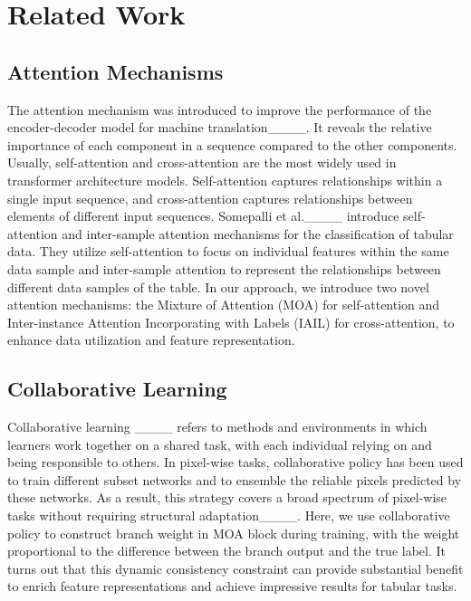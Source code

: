 \section{Related Work}
\subsection{Attention Mechanisms}
The attention mechanism was introduced to improve the performance of the encoder-decoder model for machine translation____. It reveals the relative importance of each component in a sequence compared to the other components. Usually, self-attention and cross-attention are the most widely used in transformer architecture models. Self-attention captures relationships within a single input sequence, and cross-attention captures relationships between elements of different input sequences.
Somepalli et al.____ introduce self-attention and inter-sample attention mechanisms for the classification of tabular data. They utilize self-attention to focus on individual features within the same data sample and inter-sample attention to represent the relationships between different data samples of the table.  In our approach, we introduce two novel attention mechanisms: the Mixture of Attention (MOA) for self-attention and Inter-instance Attention Incorporating with Labels (IAIL) for cross-attention, to enhance data utilization and feature representation.

\subsection{Collaborative Learning}
Collaborative learning ____ refers to methods and environments in which learners work together on a shared task, with each individual relying on and being responsible to others. In pixel-wise tasks, collaborative policy has been used to train different subset networks and to ensemble the reliable pixels predicted by these networks.  As a result, this strategy covers a broad spectrum of pixel-wise tasks without requiring structural adaptation____. Here, we use collaborative policy to construct branch weight in MOA block during training, with the weight proportional to the difference between the branch output and the true label. It turns out that this dynamic consistency constraint can provide substantial benefit to enrich feature representations and achieve impressive results for tabular tasks.